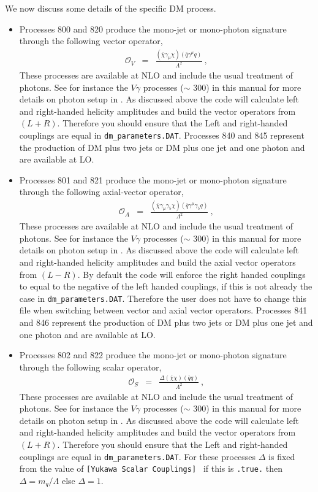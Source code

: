 \documentclass[12pt]{article}
\begin{document}
We now discuss some details of the specific DM process.

\begin{itemize}
\item 
Processes 800 and 820 produce the 
mono-jet or mono-photon signature through the following vector operator, 
\begin{eqnarray}
\mathcal{O}_V&=&\frac{(\overline{\chi}\gamma_{\mu}\chi)(\overline{q}\gamma^{\mu}q)}{\Lambda^2}~,\label{eq:OV}  
\end{eqnarray}
These processes are available at NLO and include the usual treatment of photons. See for instance the $V\gamma$ processes ($\sim$ 300) in this 
manual for more details on photon setup in \MCFM. As discussed above the code will calculate left and right-handed helicity amplitudes and build the 
vector operators from $(L+R)$. Therefore you should ensure that the Left and right-handed couplings are equal in  {\tt dm\_parameters.DAT}. 
Processes 840 and 845 represent the production of DM plus two jets or DM plus one jet and one photon and are available at LO. 
\item 
Processes 801 and 821 produce the 
mono-jet or mono-photon signature through the following axial-vector operator, 
\begin{eqnarray}
\mathcal{O}_A&=&\frac{(\overline{\chi}\gamma_{\mu}\gamma_5\chi)(\overline{q}\gamma^{\mu}\gamma_5q)}{\Lambda^2}~,\label{eq:OA}
\end{eqnarray}
These processes are available at NLO and include the usual treatment
of photons. See for instance the $V\gamma$ processes ($\sim$ 300) in
this manual for more details on photon setup in \MCFM. As discussed
above the code will calculate left and right-handed helicity
amplitudes and build the axial vector operators from $(L-R)$. By
default the code will enforce the right handed couplings to equal to
the negative of the left handed couplings, if this is not
already the case in {\tt dm\_parameters.DAT}. Therefore the user does
not have to change this file when switching between vector and axial
vector operators.  Processes 841 and 846 represent the production of
DM plus two jets or DM plus one jet and one photon and are available
at LO.
\item 
Processes 802 and 822 produce the 
mono-jet or mono-photon signature through the following scalar operator, 
\begin{eqnarray}
\mathcal{O}_S&=&\frac{\Delta(\overline{\chi}\chi)(\overline{q}q)}{\Lambda^2}~,
\end{eqnarray}
These processes are available at NLO and include the usual treatment
of photons. See for instance the $V\gamma$ processes ($\sim$ 300) in
this manual for more details on photon setup in \MCFM. As discussed
above the code will calculate left and right-handed helicity
amplitudes and build the vector operators from $(L+R)$. Therefore you
should ensure that the Left and right-handed couplings are equal in
{\tt dm\_parameters.DAT}. For these processes $\Delta$ is fixed from
the value of {\tt [Yukawa Scalar Couplings] } if this is {\tt .true.}
then $\Delta=m_q/\Lambda$ else $\Delta=1$.


\end{itemize}
\end{document}
